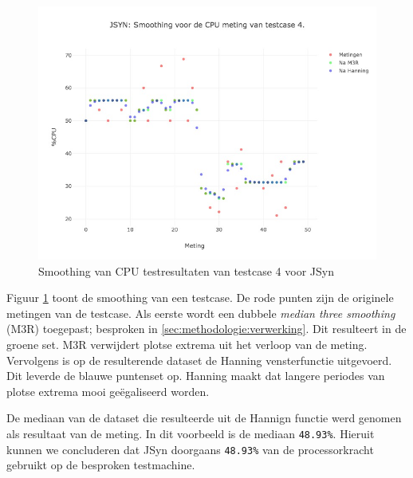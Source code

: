 \begin{figure}
    		\centering
    		\includegraphics[width=0.75\linewidth]{medians/jsyn_cpu_4}
    		\caption{Smoothing van CPU testresultaten van testcase 4  voor JSyn}
    		\label{jsyn_cpu_4}
\end{figure}

Figuur \ref{jsyn_cpu_4} toont de smoothing van een testcase. De rode punten zijn de originele metingen van de testcase. Als eerste wordt een dubbele \textit{median three smoothing} (M3R) toegepast; besproken in \ref{sec:methodologie:verwerking}. Dit resulteert in de groene set. M3R verwijdert plotse extrema uit het verloop van de meting. Vervolgens is op de resulterende dataset de Hanning vensterfunctie uitgevoerd. Dit leverde de blauwe puntenset op. Hanning maakt dat langere periodes van plotse extrema mooi geëgaliseerd worden.

De mediaan van de dataset die resulteerde uit de Hannign functie werd genomen als resultaat van de meting. In dit voorbeeld is de mediaan \verb+48.93%+. Hieruit kunnen we concluderen dat JSyn doorgaans \verb+48.93%+ van de processorkracht gebruikt op de besproken testmachine.

